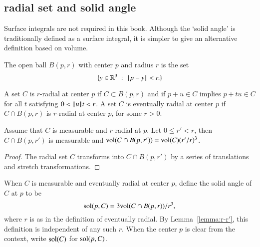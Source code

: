 \subsection{radial set and solid angle}\label{sec:solid}

Surface integrals are not required in this book.  Although
the `solid angle' is traditionally defined as a surface integral,
it is simpler to give an alternative definition based on volume.


\begin{definition}  The open ball $B(p,r)$ with center $p$ and
radius $r$ is the set
    $$
    \{ y\in\mathbb{R}^3 \ :\  {\hskip0.1em|\hskip-0.15em|\hskip0.1em}p - y{\hskip0.1em|\hskip-0.15em|\hskip0.1em} < r.\}
    $$
\end{definition}



\begin{definition}[radial]
    A set $C$ is $r$-radial at center $p$ if  $C\subset B(p,r)$
    and if
        $p + u \in C$ implies
        $p + t u \in C$ for all $t$ satisfying $0 < {{\hskip0.1em|\hskip-0.15em|\hskip0.1em}u{\hskip0.1em|\hskip-0.15em|\hskip0.1em}} t < r$.
A set $C$ is eventually radial at center $p$ if $C\cap B(p,r)$ is
$r$-radial at center $p$, for some $r>0$.
\end{definition}

\begin{lemma}
Assume that $C$ is measurable and $r$-radial at $p$.  Let $0\le r'<r$,
then $C\cap B(p,r')$ is measurable and
${\operatorname{vol}}(C\cap B(p,r')) = {\operatorname{vol}}(C) (r'/r)^3$.
\end{lemma}

\begin{proof}  The radial set $C$ transforms into $C\cap B(p,r')$ by
a series of translations and stretch transformations.
\end{proof}


\begin{definition}
When $C$ is measurable and eventually radial at center $p$, 
define the solid angle of $C$ at $p$ to be
    $$
    {\operatorname{sol}}(p,C) = 3 {\operatorname{vol}}(C\cap B(p,r))/r^3,
    $$
where $r$ is as in the definition of eventually radial. 
By Lemma~\ref{lemma:r-r'}, this
definition is independent of any such $r$.  When the center $p$ is
clear from the context, write ${\operatorname{sol}}(C)$ for
${\operatorname{sol}}(p,C)$.
\end{definition}



